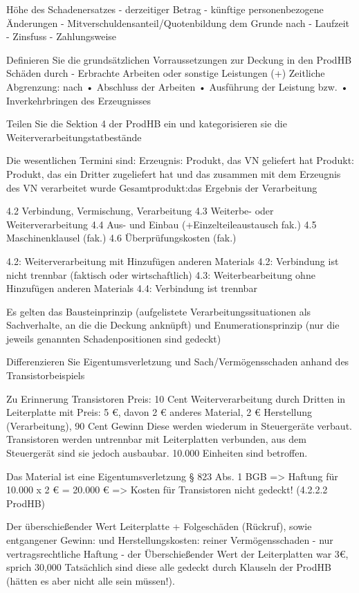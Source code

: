 Höhe des Schadenersatzes
- derzeitiger Betrag
- künftige personenbezogene Änderungen
- Mitverschuldensanteil/Quotenbildung dem Grunde nach
- Laufzeit
- Zinsfuss
- Zahlungsweise



Definieren Sie die grundsätzlichen Vorraussetzungen zur Deckung in den ProdHB 
Schäden durch
- Erbrachte Arbeiten oder sonstige Leistungen (+)
Zeitliche Abgrenzung: nach
• Abschluss der Arbeiten
• Ausführung der Leistung bzw.
• Inverkehrbringen des Erzeugnisses




Teilen Sie die Sektion 4 der ProdHB ein und kategorisieren sie die Weiterverarbeitungstatbestände

Die wesentlichen Termini sind:
Erzeugnis: Produkt, das VN geliefert hat
Produkt: Produkt, das ein Dritter zugeliefert hat und das zusammen mit dem Erzeugnis des VN verarbeitet wurde
Gesamtprodukt:das Ergebnis der Verarbeitung

4.2 Verbindung, Vermischung, Verarbeitung
4.3 Weiterbe- oder Weiterverarbeitung
4.4 Aus- und Einbau (+Einzelteileaustausch fak.)
4.5 Maschinenklausel (fak.)
4.6 Überprüfungskosten (fak.)

4.2: Weiterverarbeitung mit
Hinzufügen anderen Materials
4.2: Verbindung ist nicht trennbar (faktisch
oder wirtschaftlich)
4.3: Weiterbearbeitung ohne Hinzufügen anderen Materials
4.4: Verbindung ist trennbar

Es gelten das
Bausteinprinzip (aufgelistete
Verarbeitungssituationen als
Sachverhalte, an die die Deckung
anknüpft)
und
Enumerationsprinzip (nur die jeweils
genannten Schadenpositionen sind
gedeckt)


Differenzieren Sie Eigentumsverletzung und Sach/Vermögensschaden anhand des Transistorbeispiels

Zu Erinnerung
Transistoren Preis: 10 Cent
Weiterverarbeitung durch Dritten in Leiterplatte mit Preis: 5 €,
davon
2 € anderes Material,
2 € Herstellung (Verarbeitung),
90 Cent Gewinn
Diese werden wiederum in Steuergeräte verbaut.
Transistoren werden untrennbar mit Leiterplatten verbunden,
aus dem Steuergerät sind sie jedoch ausbaubar.
10.000 Einheiten sind betroffen.

Das Material ist eine Eigentumsverletzung § 823 Abs. 1 BGB
=> Haftung für 10.000 x 2 € = 20.000 €
=> Kosten für Transistoren nicht gedeckt! (4.2.2.2 ProdHB)

Der überschießender Wert Leiterplatte + Folgeschäden (Rückruf), sowie entgangener Gewinn:
und Herstellungskosten:
reiner Vermögensschaden
- nur vertragsrechtliche Haftung
- der Überschießender Wert der Leiterplatten war 3€, sprich 30,000
Tatsächlich sind diese alle gedeckt durch Klauseln der ProdHB (hätten es aber nicht alle sein müssen!).


